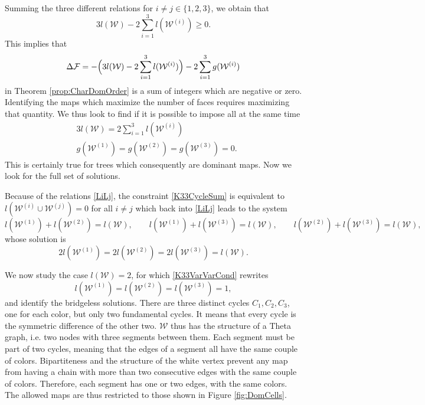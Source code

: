 \documentclass[aps,prd,10pt,notitlepage,nofootinbib,superscriptaddress,showkeys,showpacs]{revtex4-1}
\begin{document}
Summing the three different relations for $i\neq j\in\{1, 2, 3\}$, we obtain that
\begin{equation}
3l({\mathcal{W}})-2\sum_{i=1}^3 l({\mathcal{W}}^{(i)})\geq0. 
\end{equation}
This implies that
\begin{equation}
\Delta {\mathcal{F}} = -\Bigl(3l({\mathcal{W}}) - 2 \sum_{i=1}^3 l({\mathcal{W}}^{(i)}) \Bigr) - 2\sum_{i=1}^3 g({\mathcal{W}}^{(i)})
\end{equation}
in Theorem \ref{prop:CharDomOrder} is a sum of integers which are negative or zero. Identifying the maps which maximize the number of faces requires maximizing that quantity. We thus look to find if it is possible to impose all at the same time
\begin{subequations}
\label{K33DomOrd}
\begin{align}
&3l({\mathcal{W}})=2\sum_{i=1}^3 l({\mathcal{W}}^{(i)}) \label{K33CycleSum}\\
&g({\mathcal{W}}^{(1)})=g({\mathcal{W}}^{(2)})=g({\mathcal{W}}^{(3)})=0 \label{K33Planar}.
\end{align}
\end{subequations}
This is certainly true for trees which consequently are dominant maps. Now we look for the full set of solutions.

Because of the relations \eqref{LiLj}, the constraint \eqref{K33CycleSum} is equivalent to $l({\mathcal{W}}^{(i)}\cup {\mathcal{W}}^{(j)})=0$ for all $i\neq j$ which back into \eqref{LiLj} leads to the system
\begin{equation}
\label{K33VarCond}
l({\mathcal{W}}^{(1)}) + l({\mathcal{W}}^{(2)}) = l({\mathcal{W}}), \qquad l({\mathcal{W}}^{(1)}) + l({\mathcal{W}}^{(3)}) = l({\mathcal{W}}), \qquad l({\mathcal{W}}^{(2)}) + l({\mathcal{W}}^{(3)}) = l({\mathcal{W}}),
\end{equation}
whose solution is
\begin{equation}
\label{K33VarVarCond}
2l({\mathcal{W}}^{(1)}) = 2l({\mathcal{W}}^{(2)}) = 2l({\mathcal{W}}^{(3)}) = l({\mathcal{W}}).
\end{equation}

We now study the case $l({\mathcal{W}})=2$, for which \eqref{K33VarVarCond} rewrites
\begin{equation}
l({\mathcal{W}}^{(1)})=l({\mathcal{W}}^{(2)})=l({\mathcal{W}}^{(3)})=1,
\end{equation}
and identify the bridgeless solutions. There are three distinct cycles $C_1, C_2, C_3$, one for each color, but only two fundamental cycles. It means that every cycle is the symmetric difference of the other two. ${\mathcal{W}}$ thus has the structure of a Theta graph, i.e. two nodes with three segments between them. Each segment must be part of two cycles, meaning that the edges of a segment all have the same couple of colors. Bipartiteness and the structure of the white vertex prevent any map from having a chain with more than two consecutive edges with the same couple of colors. Therefore, each segment has one or two edges, with the same colors. The allowed maps are thus restricted to those shown in Figure \ref{fig:DomCells}.
\end{document}
